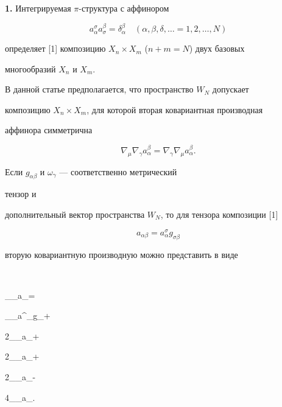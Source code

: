  


{\bf 1.} Интегрируемая $\pi$-структура с аффинором 


$$ 


a^\sigma_\alpha a^\beta_\sigma=\delta^\beta_\alpha\quad 


(\alpha,\beta,\delta,\dotsc=1,2,\dotsc,N) 


$$ 


определяет [1] композицию $X_n\times X_m$ ($n+m=N$) двух базовых 


многообразий $X_n$ и $X_m$. 


 


В данной статье предполагается, что пространство $W_N$ допускает 


композицию $X_n\times X_m$, для которой вторая ковариантная производная 


аффинора симметрична


\begin{equation} 


\nabla_\mu\nabla_\gamma a^\beta_\alpha= 


\nabla_\gamma\nabla_\mu a^\beta_\alpha. 


\end{equation} 


 


Если $g_{\alpha\beta}$ и $\omega_\gamma$ --- соответственно метрический 


тензор и 


дополнительный вектор пространства $W_N$, то для тензора композиции [1] 


\begin{equation} 


a_{\alpha\beta}=a^\sigma_\alpha g_{\sigma\beta} 


\end{equation} 


вторую ковариантную производную можно представить в виде 


$$ 


\nabla_\mu\nabla_\gamma a_{\alpha\beta}= 


\nabla_\mu\nabla_\gamma a^\sigma_\alpha g_{\sigma\beta}+ 


2\omega_\mu\nabla_\gamma a_{\alpha\beta}+ 


2\omega_\gamma\nabla_\mu a_{\alpha\beta}+ 


2\nabla_\mu\omega_\gamma a_{\alpha\beta}- 


4\omega_\mu\omega_\gamma a_{\alpha\beta}. 


